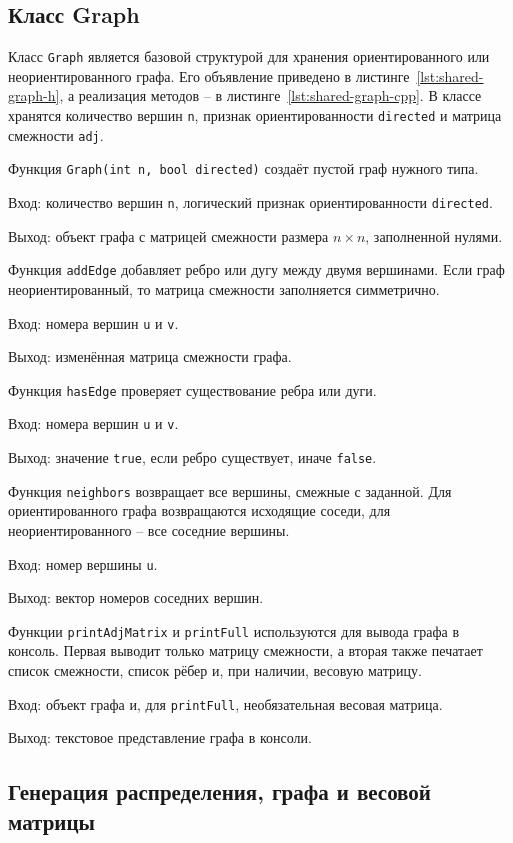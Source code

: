\documentclass[a4paper,final]{article}
\begin{document}
\subsection{Класс Graph}

Класс \texttt{Graph} является базовой структурой для хранения ориентированного или неориентированного графа. Его объявление приведено в листинге~\ref{lst:shared-graph-h}, а реализация методов -- в листинге~\ref{lst:shared-graph-cpp}. В классе хранятся количество вершин \texttt{n}, признак ориентированности \texttt{directed} и матрица смежности \texttt{adj}.

Функция \texttt{Graph(int n, bool directed)} создаёт пустой граф нужного типа.

Вход: количество вершин \texttt{n}, логический признак ориентированности \texttt{directed}.

Выход: объект графа с матрицей смежности размера $n \times n$, заполненной нулями.

Функция \texttt{addEdge} добавляет ребро или дугу между двумя вершинами. Если граф неориентированный, то матрица смежности заполняется симметрично.

Вход: номера вершин \texttt{u} и \texttt{v}.

Выход: изменённая матрица смежности графа.

Функция \texttt{hasEdge} проверяет существование ребра или дуги.

Вход: номера вершин \texttt{u} и \texttt{v}.

Выход: значение \texttt{true}, если ребро существует, иначе \texttt{false}.

Функция \texttt{neighbors} возвращает все вершины, смежные с заданной. Для ориентированного графа возвращаются исходящие соседи, для неориентированного -- все соседние вершины.

Вход: номер вершины \texttt{u}.

Выход: вектор номеров соседних вершин.

Функции \texttt{printAdjMatrix} и \texttt{printFull} используются для вывода графа в консоль. Первая выводит только матрицу смежности, а вторая также печатает список смежности, список рёбер и, при наличии, весовую матрицу.

Вход: объект графа и, для \texttt{printFull}, необязательная весовая матрица.

Выход: текстовое представление графа в консоли.

\subsection{Генерация распределения, графа и весовой матрицы}
\end{document}
